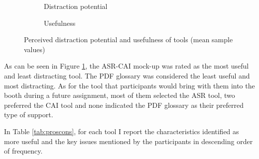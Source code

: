 \begin{figure}
\begin{subfigure}[b]{.5\textwidth}\centering
{}
\caption{Distraction potential}
\end{subfigure}\begin{subfigure}[b]{.5\textwidth}
\centering
{}
\caption{Usefulness}
\end{subfigure}
\caption{Perceived distraction potential and usefulness of tools (mean sample values)\label{fig:distract_useful}}
\end{figure}

As can be seen in Figure \ref{fig:distract_useful}, the ASR-CAI mock-up was rated as the most useful and least distracting tool. The PDF glossary was considered the least useful and most distracting. As for the tool that participants would bring with them into the booth during a future assignment, most of them selected the ASR tool, two preferred the CAI tool and none indicated the PDF glossary as their preferred type of support.

In Table \ref{tab:proscons}, for each tool I report the characteristics identified as more useful and the key issues mentioned by the participants in descending order of frequency.

